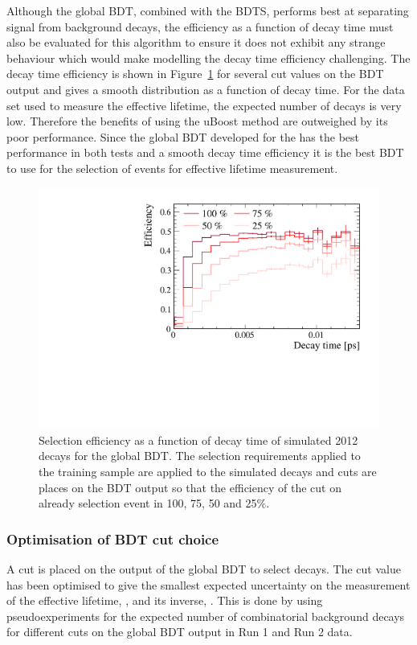 Although the global BDT, combined with the BDTS, performs best at separating signal from background decays, the efficiency as a function of decay time must also be evaluated for this algorithm to ensure it does not exhibit any strange behaviour which would make modelling the decay time efficiency challenging. The decay time efficiency is shown in Figure~\ref{fig:accptsBFBDTs} for several cut values on the BDT output and gives a smooth distribution as a function of decay time. For the data set used to measure the \bsmumu effective lifetime, the expected number of \bsmumu decays is very low. Therefore the benefits of using the uBoost method are outweighed by its poor performance. Since the global BDT developed for the \BFm has the best performance in both tests and a smooth decay time efficiency it is the best BDT to use for the selection of events for effective lifetime measurement. 
\begin{figure}[htbp]
    \centering
        \includegraphics[width=0.6 \textwidth]{./Figs/Selection/BDT1_acceptances.pdf}
    \caption{Selection efficiency as a function of decay time of simulated 2012 \bsmumu decays for the global BDT. The selection requirements applied to the training sample are applied to the simulated decays and cuts are places on the BDT output so that the efficiency of the cut on already selection event in 100, 75, 50 and 25$\%$. }
    \label{fig:accptsBFBDTs}
\end{figure}

\subsubsection{Optimisation of BDT cut choice}
\label{sec:globalBDToptimisation}

A cut is placed on the output of the global BDT to select \bsmumu decays. The cut value has been optimised to give the smallest expected uncertainty on the measurement of the \bsmumu effective lifetime, \tmumu, and its inverse, \invtmumu. This is done by using pseudoexperiments for the expected number of \bsmumu combinatorial background decays for different cuts on the global BDT output in Run 1 and Run 2 data. %

